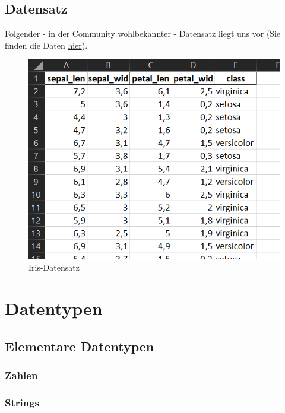 \documentclass[
  oneside]{book}
\begin{document}
\hypertarget{datensatz}{%
\subsection{Datensatz}\label{datensatz}}

Folgender - in der Community wohlbekannter - Datensatz liegt uns vor (Sie finden die Daten \href{https://syncandshare.lrz.de/getlink/fi89kxTJ5yLRaW5mnpyrofVK/Iris_p.xlsx}{hier}).

\begin{figure}
\centering
\includegraphics{assets/daten.assets/image-20211209101425856-16426070878651.png}
\caption{Iris-Datensatz}
\end{figure}

\hypertarget{datentypen}{%
\section{Datentypen}\label{datentypen}}

\hypertarget{elementare-datentypen-1}{%
\subsection{Elementare Datentypen}\label{elementare-datentypen-1}}

\hypertarget{zahlen-1}{%
\subsubsection{Zahlen}\label{zahlen-1}}

\hypertarget{strings}{%
\subsubsection{Strings}\label{strings}}
\end{document}
